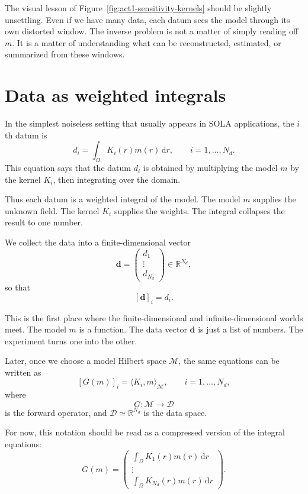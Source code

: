 \documentclass[11pt,openany]{book}
\theoremstyle{definition}
\theoremstyle{remark}
\newcommand{\M}{\mathcal M}
\newcommand{\D}{\mathcal D}
\newcommand{\dd}{\,\mathrm d}
\begin{document}
The visual lesson of Figure~\ref{fig:act1-sensitivity-kernels} should be slightly unsettling.
Even if we have many data, each datum sees the model through its own distorted window. The
inverse problem is not a matter of simply reading off \(m\). It is a matter of understanding what
can be reconstructed, estimated, or summarized from these windows.

\section{Data as weighted integrals}

In the simplest noiseless setting that usually appears in SOLA applications, the \(i\)th datum is
\[
  d_i
  =
  \int_\Omega K_i(r)m(r)\dd r,
  \qquad i=1,\dots,N_d.
\]
This equation says that the datum \(d_i\) is obtained by multiplying the model \(m\) by the
kernel \(K_i\), then integrating over the domain.

Thus each datum is a weighted integral of the model. The model \(m\) supplies the unknown
field. The kernel \(K_i\) supplies the weights. The integral collapses the result to one number.

We collect the data into a finite-dimensional vector
\[
  \mathbf d
  =
  \begin{pmatrix}
    d_1\\
    \vdots\\
    d_{N_d}
  \end{pmatrix}
  \in\mathbb R^{N_d},
\]
so that
\[
  [\mathbf d]_i=d_i.
\]

This is the first place where the finite-dimensional and infinite-dimensional worlds meet. The
model \(m\) is a function. The data vector \(\mathbf d\) is just a list of numbers. The experiment
turns one into the other.

Later, once we choose a model Hilbert space \(\M\), the same equations can be written as
\[
  [G(m)]_i
  =
  \langle K_i,m\rangle_{\M},
  \qquad i=1,\dots,N_d,
\]
where
\[
  G:\M\to\D
\]
is the forward operator, and \(\D\simeq\mathbb R^{N_d}\) is the data space.

For now, this notation should be read as a compressed version of the integral equations:
\[
  G(m)
  =
  \begin{pmatrix}
    \int_\Omega K_1(r)m(r)\dd r\\
    \vdots\\
    \int_\Omega K_{N_d}(r)m(r)\dd r
  \end{pmatrix}.
\]
\end{document}
